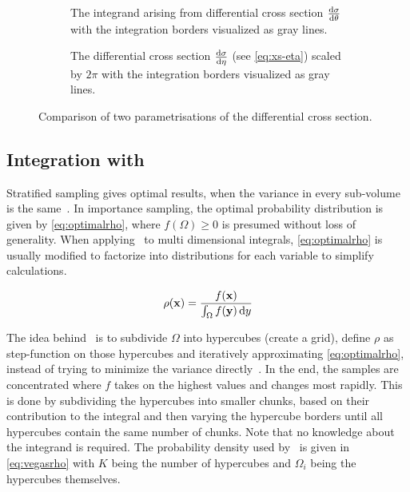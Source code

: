 \begin{figure}[ht]
  \centering
  \begin{subfigure}[c]{.49\textwidth}
    \caption[\(2\pi\dv{\sigma}{\theta}\) with integration
    boundaries]{\label{fig:xs-int-theta} The integrand arising from
      differential cross section \(\dv{\sigma}{\theta}\) with the
      integration borders visualized as gray lines.}
  \end{subfigure}
  \begin{subfigure}[c]{.49\textwidth}
    \caption[Differential cross section for \(\qqgg\) with integration
    boundaries]{\label{fig:xs-int-eta} The differential cross section
      \(\dv{\sigma}{\eta}\) (see \cref{eq:xs-eta}) scaled by \(2\pi\)
      with the integration borders visualized as gray lines.}
  \end{subfigure}
  \caption{\label{fig:xs-int-comp} Comparison of two parametrisations
    of the differential cross section.}
\end{figure}

\subsection{Integration with \vegas}
\label{sec:mcintvegas}

Stratified sampling gives optimal results, when the variance in every
sub-volume is the same~\cite{Lepage:19781an}. In importance sampling,
the optimal probability distribution is given
by \cref{eq:optimalrho}, where \(f(\Omega) \geq 0\) is presumed
without loss of generality. When applying \vegas\ to multi dimensional
integrals, \cref{eq:optimalrho} is usually modified to factorize into
distributions for each variable to simplify calculations.

\begin{equation}
  \label{eq:optimalrho}
  \rho(\vb{x}) = \frac{f(\vb{x})}{\int_\Omega f(\vb{y})\dd{y}}
\end{equation}

The idea behind \vegas\ is to subdivide \(\Omega\) into hypercubes
(create a grid), define \(\rho\) as step-function on those hypercubes
and iteratively approximating \cref{eq:optimalrho}, instead of trying
to minimize the variance directly~\cite{Lepage:19781an}. In the end,
the samples are concentrated where \(f\) takes on the highest values
and changes most rapidly. This is done by subdividing the hypercubes
into smaller chunks, based on their contribution to the integral and
then varying the hypercube borders until all hypercubes contain the
same number of chunks. Note that no knowledge about the integrand is
required. The probability density used by \vegas\ is given in
\cref{eq:vegasrho} with \(K\) being the number of hypercubes and
\(\Omega_i\) being the hypercubes themselves.

